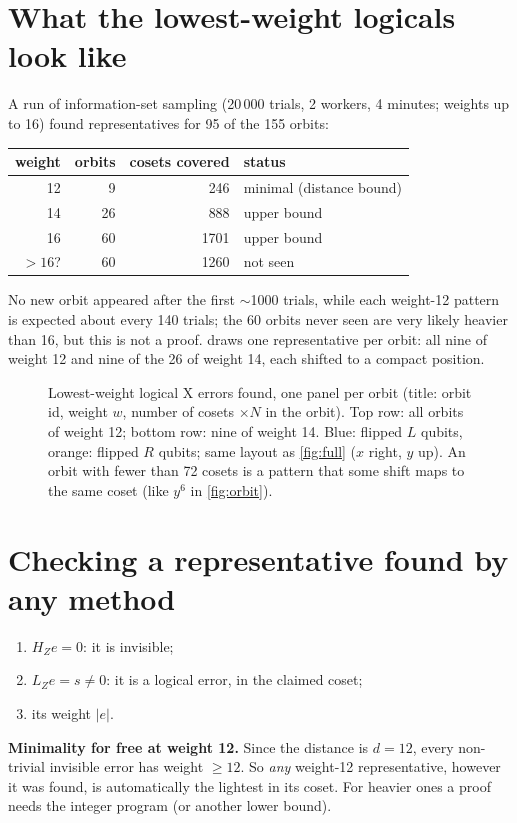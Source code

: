 \documentclass[11pt]{article}
\begin{document}
\section{What the lowest-weight logicals look like}

A run of information-set sampling (20\,000 trials, 2 workers, 4 minutes; weights up to 16)
found representatives for 95 of the 155 orbits:

\begin{center}
\begin{tabular}{rrrl}
\toprule
weight & orbits & cosets covered & status \\
\midrule
12 & 9  & 246  & minimal (distance bound) \\
14 & 26 & 888  & upper bound \\
16 & 60 & 1701 & upper bound \\
$>16$? & 60 & 1260 & not seen \\
\bottomrule
\end{tabular}
\end{center}
No new orbit appeared after the first $\sim$1000 trials, while each weight-12 pattern is
expected about every 140 trials; the 60 orbits never seen are very likely heavier than 16, but
this is not a proof.  draws one representative per orbit: all nine of weight 12
and nine of the 26 of weight 14, each shifted to a compact position.

\begin{figure}[h]
\centering

\caption{Lowest-weight logical X errors found, one panel per orbit (title: orbit id, weight $w$,
number of cosets $\times N$ in the orbit). Top row: all orbits of weight 12; bottom row: nine of
weight 14. Blue: flipped $L$ qubits, orange: flipped $R$ qubits; same layout as \cref{fig:full}
($x$ right, $y$ up). An orbit with fewer than 72 cosets is a pattern that some shift maps to
the same coset (like $y^6$ in \cref{fig:orbit}).}
\label{fig:found}
\end{figure}

\section{Checking a representative found by any method}

\begin{enumerate}
\item $H_Z e = 0$: it is invisible;
\item $L_Z e = s \ne 0$: it is a logical error, in the claimed coset;
\item its weight $|e|$.
\end{enumerate}
\textbf{Minimality for free at weight 12.} Since the distance is $d = 12$, every non-trivial
invisible error has weight $\ge 12$. So \emph{any} weight-12 representative, however it was
found, is automatically the lightest in its coset. For heavier ones a proof needs the integer
program (or another lower bound).
\end{document}
